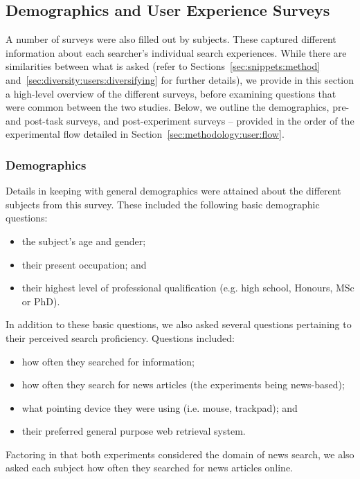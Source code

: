 \subsection{Demographics and User Experience Surveys}\label{sec:methodology:extracting:user}
A number of surveys were also filled out by subjects. These captured different information about each searcher's individual search experiences. While there are similarities between what is asked (refer to Sections~\ref{sec:snippets:method} and~\ref{sec:diversity:users:diversifying} for further details), we provide in this section a high-level overview of the different surveys, before examining questions that were common between the two studies. Below, we outline the demographics, pre- and post-task surveys, and post-experiment surveys -- provided in the order of the experimental flow detailed in Section~\ref{sec:methodology:user:flow}.

\subsubsection{Demographics}
Details in keeping with general demographics were attained about the different subjects from this survey. These included the following basic demographic questions:

\begin{itemize}
    \item{the subject's age and gender;}
    \item{their present occupation; and}
    \item{their highest level of professional qualification (e.g. high school, Honours, MSc or PhD).}
\end{itemize}

In addition to these basic questions, we also asked several questions pertaining to their perceived search proficiency. Questions included:

\begin{itemize}
    \item{how often they searched for information;}
    \item{how often they search for news articles (the experiments being news-based);}
    \item{what pointing device they were using (i.e. mouse, trackpad); and}
    \item{their preferred general purpose web retrieval system.}
\end{itemize}

Factoring in that both experiments considered the domain of news search, we also asked each subject how often they searched for news articles online.

